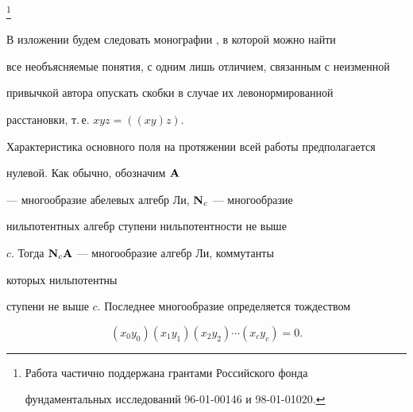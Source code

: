 \thanks{Работа частично поддержана грантами Российского фонда


фундаментальных исследований 96-01-00146 и 98-01-01020.}


\date{}







\pagestyle{plain} %













\maketitle


\label{begin}





В изложении будем следовать монографии \cite{1}, в которой можно найти


все необъясняемые понятия, с одним лишь отличием, связанным с неизменной


привычкой автора опускать скобки в случае их левонормированной


расстановки, т.\,е. $xyz=((xy)z)$.





Характеристика основного поля на протяжении всей работы предполагается


нулевой. Как обычно, обозначим $\bold A$


--- многообразие абелевых алгебр Ли, $\bold N_c$ --- многообразие


нильпотентных алгебр ступени нильпотентности не выше


$c$. Тогда $\bold N_c\bold A$ --- многообразие алгебр Ли, коммутанты


которых нильпотентны


ступени не выше $c$. Последнее многообразие определяется тождеством


\begin{equation}


(x_0y_0)(x_1y_1)(x_2y_2)\dotsb(x_c y_c)=0.


\end{equation}






